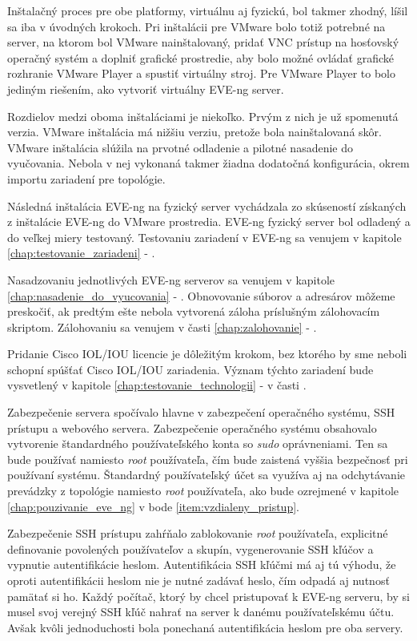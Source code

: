 Inštalačný proces pre obe platformy, virtuálnu aj fyzickú, bol takmer zhodný, líšil sa iba v úvodných krokoch. Pri inštalácii pre VMware bolo totiž potrebné na server, na ktorom bol VMware nainštalovaný, pridať VNC prístup na hosťovský operačný systém a doplniť grafické prostredie, aby bolo možné ovládať grafické rozhranie VMware Player a spustiť virtuálny stroj. Pre VMware Player to bolo jediným riešením, ako vytvoriť virtuálny EVE-ng server.

Rozdielov medzi oboma inštaláciami je niekoľko. Prvým z nich je už spomenutá verzia. VMware inštalácia má nižšiu verziu, pretože bola nainštalovaná skôr. VMware inštalácia slúžila na prvotné odladenie a pilotné nasadenie do vyučovania. Nebola v nej vykonaná takmer žiadna dodatočná konfigurácia, okrem importu zariadení pre topológie.

Následná inštalácia EVE-ng na fyzický server vychádzala zo skúseností získaných z inštalácie EVE-ng do VMware prostredia. EVE-ng fyzický server bol odladený a do veľkej miery testovaný. Testovaniu zariadení v EVE-ng sa venujem v kapitole \ref{chap:testovanie_zariadeni} - .

Nasadzovaniu jednotlivých EVE-ng serverov sa venujem v kapitole \ref{chap:nasadenie_do_vyucovania} - . Obnovovanie súborov a adresárov môžeme preskočiť, ak predtým ešte nebola vytvorená záloha príslušným zálohovacím skriptom. Zálohovaniu sa venujem v časti \ref{chap:zalohovanie} - .

Pridanie Cisco IOL/IOU licencie je dôležitým krokom, bez ktorého by sme neboli schopní spúšťať Cisco IOL/IOU zariadenia. Význam týchto zariadení bude vysvetlený v kapitole \ref{chap:testovanie_technologii} -  v časti .

Zabezpečenie servera spočívalo hlavne v zabezpečení operačného systému, SSH prístupu a webového servera. Zabezpečenie operačného systému obsahovalo vytvorenie štandardného používateľského konta so \emph{sudo} oprávneniami. Ten sa bude používať namiesto \emph{root} používateľa, čím bude zaistená vyššia bezpečnosť pri používaní systému. Štandardný používateľský účet sa využíva aj na odchytávanie prevádzky z topológie namiesto \emph{root} používateľa, ako bude ozrejmené v kapitole \ref{chap:pouzivanie_eve_ng} v bode \ref{item:vzdialeny_pristup}.

Zabezpečenie SSH prístupu zahŕňalo zablokovanie \emph{root} používateľa, explicitné definovanie povolených používateľov a skupín, vygenerovanie SSH kľúčov a vypnutie autentifikácie heslom. Autentifikácia SSH kľúčmi má aj tú výhodu, že oproti autentifikácii heslom nie je nutné zadávať heslo, čím odpadá aj nutnosť pamätať si ho. Každý počítač, ktorý by chcel pristupovať k EVE-ng serveru, by si musel svoj verejný SSH kľúč nahrať na server k danému používateľskému účtu. Avšak kvôli jednoduchosti bola ponechaná autentifikácia heslom pre oba servery.

